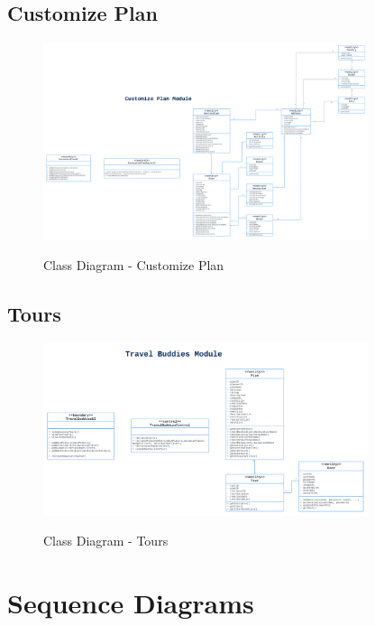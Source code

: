 \documentclass[12pt]{article}
\begin{document}
\newpage
\subsection{Customize Plan}
\begin{figure}[H]
    \centering
        \includegraphics[width=0.85\textwidth]{Class Diagram/CustomizePlan.png}
        \label{fig:ClassCustomize}
    \caption{Class Diagram - Customize Plan}
\end{figure}

\subsection{Tours}
\begin{figure}[H]
    \centering
        \includegraphics[width=0.85\textwidth]{Class Diagram/Travel Buddies.png}
        \label{fig:ClassTour}
    \caption{Class Diagram - Tours}
\end{figure}

\newpage

\section{Sequence Diagrams}
\end{document}
